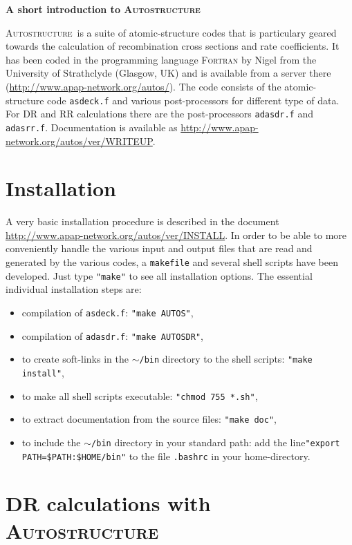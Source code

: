 \documentclass[a4paper,12pt]{article}
\newcommand{\autos}{\textsc{Autostructure}}
\begin{document}
\textbf{\huge A short introduction to \autos}

\autos\ is a suite of atomic-structure codes that is particulary geared towards the calculation of recombination cross sections and rate coefficients. It has been coded in the programming language \textsc{Fortran} by Nigel \citet{Badnell2011b} from the University of Strathclyde (Glasgow, UK) and is available from a server there (\url{http://www.apap-network.org/autos/}). The code consists of the atomic-structure code \texttt{asdeck.f} and various post-processors for different type of data. For DR and RR calculations there are the post-processors \texttt{adasdr.f} and \texttt{adasrr.f}. Documentation is available as \url{http://www.apap-network.org/autos/ver/WRITEUP}.

\section{Installation}

A very basic installation procedure is described in the document \url{http://www.apap-network.org/autos/ver/INSTALL}. In order to be able to more conveniently handle the various input and output files that are read and generated by the various codes, a \texttt{makefile} and several shell scripts have been developed. Just type \texttt{"make"} to see all installation options. The essential individual installation steps are:
\begin{itemize}
\item compilation of \texttt{asdeck.f}: \texttt{"make AUTOS"},
\item compilation of \texttt{adasdr.f}: \texttt{"make AUTOSDR"},
\item to create soft-links in the \texttt{$\sim$/bin} directory to the shell scripts: \texttt{"make install"},
\item to make all shell scripts executable: \texttt{"chmod 755 *.sh"},
\item to extract documentation from the source files: \texttt{"make doc"},
\item to include the \texttt{$\sim$/bin} directory in your standard path: add the line\newline \texttt{"export PATH=\$PATH:\$HOME/bin"} to the file \texttt{.bashrc} in your home-directory.
\end{itemize}

\section{DR calculations with \autos}
\end{document}
